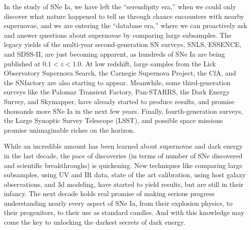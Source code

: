 \documentclass{nature1}
\begin{document}
In the study of SNe Ia, we have left the ``serendipity era,'' when we
could only discover what nature happened to tell us through chance
encounters with nearby supernovae, and we are entering the ``database
era,'' where we can proactively ask and answer questions about
supernovae by comparing large subsamples.  The legacy yields of the
multi-year second-generation SN surveys,
SNLS\citep{2006A&A...447...31A}, ESSENCE\citep{2007ApJ...666..694W},
and SDSS-II\citep{2009ApJS..185...32K}, are just becoming apparent, as
hundreds of SNe Ia are being published at $0.1<z<1.0$.  At low
redshift, large samples from the Lick Observatory Supernova
Search\citep{2010arXiv1002.3056M}, the Carnegie Supernova
Project\citep{2010AJ....139..120F}, the
CfA\citep{2009ApJ...700.1097H}, and the
SNfactory\citep{2009A&A...500L..17B} are also starting to appear.
Meanwhile, some third-generation surveys like the Palomar Transient
Factory, Pan-STARRS, the Dark Energy Survey, and Skymapper, have
already started to produce results, and promise thousands more SNe Ia
in the next few years.  Finally, fourth-generation surveys, the Large
Synoptic Survey Telescope (LSST), and possible space missions promise
unimaginable riches on the horizon.

While an incredible amount has been learned about supernovae and dark
energy in the last decade, the pace of discoveries (in terms of number
of SNe discovered and scientific breakthroughs) is quickening.  New
techniques like comparing large subsamples, using UV and IR data,
state of the art calibration, using host galaxy observations, and 3d
modeling, have started to yield results, but are still in their
infancy. The next decade holds real promise of making serious progress
understanding nearly every aspect of SNe Ia, from their explosion
physics, to their progenitors, to their use as standard candles.  And
with this knowledge may come the key to unlocking the darkest secrets
of dark energy.


\end{document}
